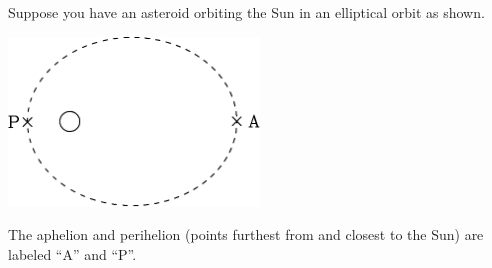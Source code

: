\documentclass[12pt]{article}
\begin{document}
Suppose you have an asteroid orbiting the Sun in an elliptical orbit as shown.

\begin{center}
\includegraphics[width=0.5\textwidth]{orbit-crop.pdf}
\end{center}

The aphelion and perihelion (points furthest from and closest to the Sun) are labeled ``A'' and ``P''.
\end{document}
